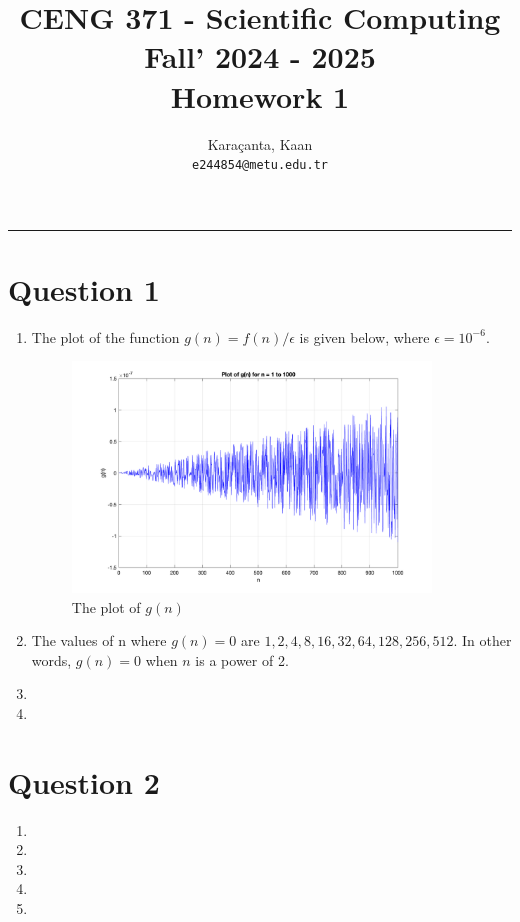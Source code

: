 \documentclass[11pt,a4paper, margin=1in]{article}
\author{
  Karaçanta, Kaan\\
  \texttt{e244854@metu.edu.tr}
}
\title{CENG 371 - Scientific Computing \\
Fall' 2024 - 2025 \\
Homework 1}
\begin{document}
\maketitle

\noindent\rule{19cm}{1.2pt}

\section*{Question 1}

\begin{enumerate}
    \item The plot of the function \( g(n) = f(n) / \epsilon \) is given below, where \( \epsilon = 10^{-6} \).
    \begin{figure}[H]
        \centering
        \includegraphics[width=0.9\textwidth]{q1.png}
        \caption{The plot of \(g(n)\)}
    \end{figure}

    \item The values of n where \( g(n) = 0 \) are \( 1, 2, 4, 8, 16, 32, 64, 128, 256, 512 \). In other words, \( g(n) = 0 \) when \(n\) is a power of 2. 
    
    \item 
    
    \item 

\end{enumerate}

\section*{Question 2}

\begin{enumerate}

    \item 

    \item

    \item

    \item

    \item

\end{enumerate}
\end{document}
